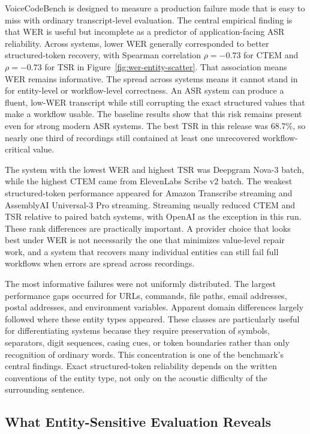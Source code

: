 \documentclass[10pt,twocolumn]{article}
\begin{document}
VoiceCodeBench is designed to measure a production failure mode that
is easy to miss with ordinary transcript-level evaluation. The central
empirical finding is that WER is useful but incomplete as a predictor of
application-facing ASR reliability. Across systems, lower WER generally
corresponded to better structured-token recovery, with Spearman
correlation $\rho=-0.73$ for CTEM and $\rho=-0.73$ for TSR in
Figure~\ref{fig:wer-entity-scatter}. That association means WER remains
informative. The spread across systems means it cannot stand in for
entity-level or workflow-level correctness. An ASR system can produce a
fluent, low-WER transcript while still corrupting the exact structured
values that make a workflow usable. The baseline results show that this
risk remains present even for strong modern ASR systems. The best TSR in
this release was 68.7\%, so nearly one third of recordings still
contained at least one unrecovered workflow-critical value.

The system with the lowest WER and highest TSR was Deepgram Nova-3
batch, while the highest CTEM came from ElevenLabs Scribe v2 batch. The
weakest structured-token performance appeared for Amazon Transcribe
streaming and AssemblyAI Universal-3 Pro streaming. Streaming usually
reduced CTEM and TSR relative to paired batch systems, with OpenAI as the
exception in this run. These rank differences are practically important. A
provider choice that looks best under WER is not necessarily the one
that minimizes value-level repair work, and a system that recovers many
individual entities can still fail full workflows when errors are spread
across recordings.

The most informative failures were not uniformly distributed. The largest
performance gaps occurred for URLs, commands, file paths, email
addresses, postal addresses, and environment variables. Apparent domain
differences largely followed where these entity types appeared. These
classes are particularly useful for differentiating systems because they
require preservation of symbols, separators, digit sequences, casing
cues, or token boundaries rather than only recognition of ordinary words.
This concentration is one of the benchmark's central findings. Exact
structured-token reliability depends on the written conventions of the
entity type, not only on the acoustic difficulty of the surrounding
sentence.

\subsection{What Entity-Sensitive Evaluation
	Reveals}\label{what-entity-sensitive-evaluation-reveals}
\end{document}
